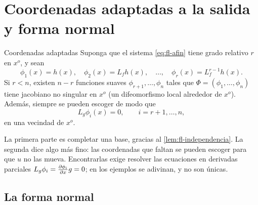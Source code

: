 \section{Coordenadas adaptadas a la salida y forma normal}
\label{sec:fl-forma}

\begin{teorema}[label=thm:fl-coordenadas]{Coordenadas adaptadas \citep[Prop.~4.1.3]{Isi95}}
Suponga que el sistema \eqref{eq:fl-afin} tiene grado relativo $r$ en $x^o$, y sean
\[
  \phi_1(x)=h(x),\quad \phi_2(x)=L_fh(x),\quad\dots,\quad \phi_r(x)=L_f^{r-1}h(x) .
\]
Si $r<n$, existen $n-r$ funciones suaves $\phi_{r+1},\dots,\phi_n$ tales que $\Phi=(\phi_1,\dots,\phi_n)$ tiene jacobiano no singular en $x^o$ (un difeomorfismo local alrededor de $x^o$). Además, siempre se pueden escoger de modo que
\begin{equation}
  L_g\phi_i(x)=0,\qquad i=r+1,\dots,n,
  \label{eq:fl-Lgphi}
\end{equation}
en una vecindad de $x^o$.
\end{teorema}

La primera parte es completar una base, gracias al \cref{lem:fl-independencia}. La segunda dice algo más fino: las coordenadas que faltan se pueden escoger para que $u$ no las mueva. Encontrarlas exige resolver las ecuaciones en derivadas parciales $L_g\phi_i=\frac{\partial \phi_i}{\partial x}g=0$; en los ejemplos se adivinan, y no son únicas.

\subsection{La forma normal}

